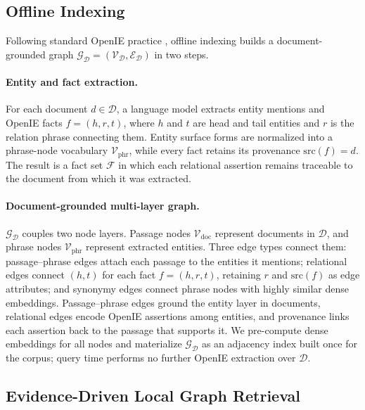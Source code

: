 \subsection{Offline Indexing}
\label{sec:method:substrate}

Following standard OpenIE practice
\citep{angeli2015leveraging,gutierrez2025hipporag}, offline indexing
builds a document-grounded graph
$\mathcal{G}_{\mathcal{D}}=(\mathcal{V}_{\mathcal{D}},\mathcal{E}_{\mathcal{D}})$
in two steps.

\paragraph{Entity and fact extraction.}
For each document $d \in \mathcal{D}$, a language model extracts entity
mentions and OpenIE facts $f=(h,r,t)$, where $h$ and $t$ are head and tail
entities and $r$ is the relation phrase connecting them. Entity surface
forms are normalized into a phrase-node vocabulary
$\mathcal{V}_{\mathrm{phr}}$, while every fact retains its provenance
$\mathrm{src}(f)=d$. The result is a fact set $\mathcal{F}$ in which each
relational assertion remains traceable to the document from which it was
extracted.

\paragraph{Document-grounded multi-layer graph.}
$\mathcal{G}_{\mathcal{D}}$ couples two node layers. Passage nodes
$\mathcal{V}_{\mathrm{doc}}$ represent documents in $\mathcal{D}$, and
phrase nodes $\mathcal{V}_{\mathrm{phr}}$ represent extracted entities.
Three edge types connect them: passage--phrase edges attach each passage
to the entities it mentions; relational edges connect $(h,t)$ for each
fact $f=(h,r,t)$, retaining $r$ and $\mathrm{src}(f)$ as edge attributes;
and synonymy edges connect phrase nodes with highly similar dense
embeddings. Passage--phrase edges ground the entity layer in documents,
relational edges encode OpenIE assertions among entities, and provenance
links each assertion back to the passage that supports it. We pre-compute
dense embeddings for all nodes and materialize
$\mathcal{G}_{\mathcal{D}}$ as an adjacency index built once for the
corpus; query time performs no further OpenIE extraction over
$\mathcal{D}$.

\subsection{Evidence-Driven Local Graph Retrieval}
\label{sec:method:retrieval}

